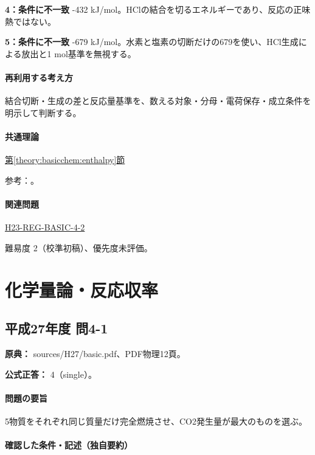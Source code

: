\noindent\textbf{4：条件に不一致} -432 kJ/mol。HClの結合を切るエネルギーであり、反応の正味熱ではない。\par

\noindent\textbf{5：条件に不一致} -679 kJ/mol。水素と塩素の切断だけの679を使い、HCl生成による放出と1 mol基準を無視する。\par

\paragraph{再利用する考え方} 結合切断・生成の差と反応量基準を、数える対象・分母・電荷保存・成立条件を明示して判断する。

\paragraph{共通理論} \hyperref[theory:basicchem:enthalpy]{第\ref*{theory:basicchem:enthalpy}節}

\par 参考：\cite{mit_bond_enthalpy}。

\paragraph{関連問題} \hyperref[q:h23-reg-basic-4-2]{H23-REG-BASIC-4-2}

\par 難易度 2（校準初稿）、優先度未評価。

\section{化学量論・反応収率}

\subsection{平成27年度 問4-1}
\label{q:h27-reg-basic-4-1}

\noindent\textbf{原典：} sources/H27/basic.pdf、PDF物理12頁。

\textbf{公式正答：} 4（single）。

\paragraph{問題の要旨} 5物質をそれぞれ同じ質量だけ完全燃焼させ、CO2発生量が最大のものを選ぶ。

\paragraph{確認した条件・記述（独自要約）}\mbox{}\par

